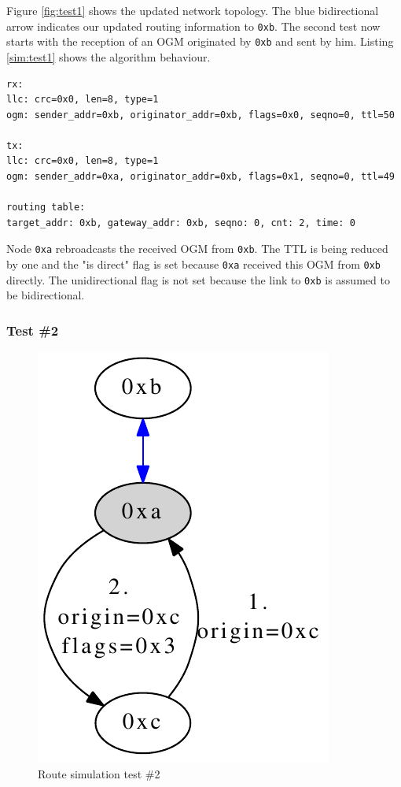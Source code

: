 Figure \ref{fig:test1} shows the updated network topology. The blue bidirectional arrow indicates our updated routing information to \texttt{0xb}. The second test now starts with the reception of an OGM originated by \texttt{0xb} and sent by him. Listing \ref{sim:test1} shows the algorithm behaviour.

\begin{lstlisting}[label=sim:test1,caption=Output of Test \#1]
rx:
llc: crc=0x0, len=8, type=1
ogm: sender_addr=0xb, originator_addr=0xb, flags=0x0, seqno=0, ttl=50

tx:
llc: crc=0x0, len=8, type=1
ogm: sender_addr=0xa, originator_addr=0xb, flags=0x1, seqno=0, ttl=49

routing table: 
target_addr: 0xb, gateway_addr: 0xb, seqno: 0, cnt: 2, time: 0
\end{lstlisting}

Node \texttt{0xa} rebroadcasts the received OGM from \texttt{0xb}. The TTL is being reduced by one and the "is direct" flag is set because \texttt{0xa} received this OGM from \texttt{0xb} directly. The unidirectional flag is not set because the link to \texttt{0xb} is assumed to be bidirectional.

\subsubsection{Test \#2}%
\begin{figure}[H]
  \begin{center}
    \includegraphics[]{figures/test2}
  \end{center}
  \caption{Route simulation test \#2}
  \label{fig:test2}
\end{figure}

